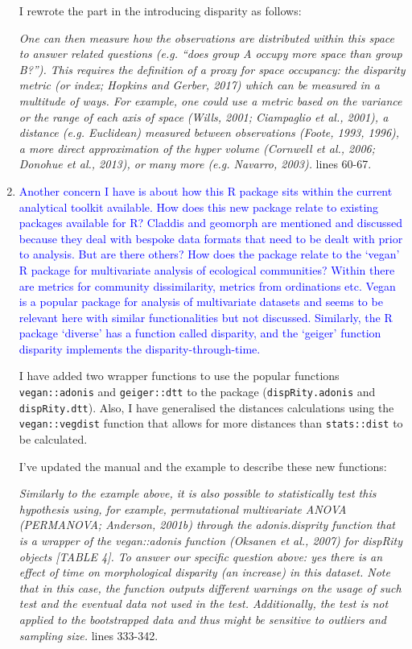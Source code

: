 \documentclass[12pt,letterpaper]{article}
\begin{document}
\begin{enumerate}
I rewrote the part in the introducing disparity as follows:

\textit{One can then measure how the observations are distributed within this space to answer related questions (e.g. ``does group A occupy more space than group B?''). This requires the definition of a proxy for space occupancy: the disparity metric (or index; Hopkins and Gerber, 2017) which can be measured in a multitude of ways. For example, one could use a metric based on the variance or the range of each axis of space (Wills, 2001; Ciampaglio et al., 2001), a distance (e.g. Euclidean) measured between observations (Foote, 1993, 1996), a more direct approximation of the hyper volume (Cornwell et al., 2006; Donohue et al., 2013), or many more (e.g. Navarro, 2003).} lines 60-67.

\item{\textcolor{blue}{Another concern I have is about how this R package sits within the current analytical toolkit available.
How does this new package relate to existing packages available for R?
Claddis and geomorph are mentioned and discussed because they deal with bespoke data formats that need to be dealt with prior to analysis.
But are there others?
How does the package relate to the ‘vegan’ R package for multivariate analysis of ecological communities?
Within there are metrics for community dissimilarity, metrics from ordinations etc.
Vegan is a popular package for analysis of multivariate datasets and seems to be relevant here with similar functionalities but not discussed.
Similarly, the R package ‘diverse’ has a function called disparity, and the ‘geiger’ function disparity implements the disparity-through-time. }}
\label{add_geiger_vegan}

I have added two wrapper functions to use the popular functions \texttt{vegan::adonis} and \texttt{geiger::dtt} to the package (\texttt{dispRity.adonis} and \texttt{dispRity.dtt}).
Also, I have generalised the distances calculations using the \texttt{vegan::vegdist} function that allows for more distances than \texttt{stats::dist} to be calculated.

I've updated the manual and the example to describe these new functions:

\textit{Similarly to the example above, it is also possible to statistically test this hypothesis using, for example, permutational multivariate ANOVA (PERMANOVA; Anderson, 2001b) through the adonis.disprity function that is a wrapper of the vegan::adonis function (Oksanen et al., 2007) for dispRity objects [TABLE 4]. To answer our specific question above: yes there is an effect of time on morphological disparity (an increase) in this dataset. Note that in this case, the function outputs different warnings on the usage of such test and the eventual data not used in the test. Additionally, the test is not applied to the bootstrapped data and thus might be sensitive to outliers and sampling size.} lines 333-342.

\end{enumerate}
\end{document}
